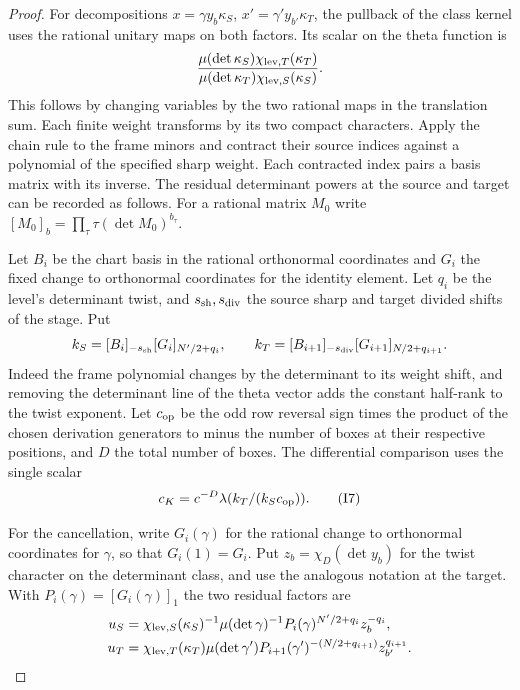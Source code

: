 \begin{proof}

For decompositions
\(x=\gamma y_b\kappa_S\), \(x'=\gamma' y_{b'}\kappa_T\),
the pullback of the class kernel uses the rational unitary
maps on both factors. Its scalar on the theta function is
\[
     \frac{\mu(\det\kappa_S)\chi_{{\rm lev},T}(\kappa_T)}
          {\mu(\det\kappa_T)\chi_{{\rm lev},S}(\kappa_S)} .
\]
This follows by changing variables by the two rational maps in
the translation sum. Each finite weight transforms by its two
compact characters. Apply the chain rule to the frame minors
and contract their source indices against a polynomial of the
specified sharp weight. Each contracted index pairs a basis
matrix with its inverse. The residual determinant powers at
the source and target can be recorded as follows. For a rational
matrix \(M_0\) write \([M_0]_b=\prod_\tau\tau(\det M_0)^{b_\tau}\).

Let \(B_i\) be the chart basis in the rational orthonormal
coordinates and \(G_i\) the fixed change to orthonormal
coordinates for the identity element. Let \(q_i\) be the
level's determinant twist, and \(s_{\rm sh},s_{\rm div}\)
the source sharp and target divided shifts of the stage. Put
\[
 k_S=[B_i]_{-s_{\rm sh}}[G_i]_{N'/2+q_i},\qquad
 k_T=[B_{i+1}]_{-s_{\rm div}}[G_{i+1}]_{N/2+q_{i+1}} .
\]
Indeed the frame polynomial changes by the determinant to its
weight shift, and removing the determinant line of the theta
vector adds the constant half-rank to the twist exponent.
Let \(c_{\rm op}\) be the odd row reversal sign times the product
of the chosen derivation generators to minus the number of boxes
at their respective positions, and \(D\) the total number of boxes.
The differential comparison uses the single scalar
\[
                 c_K=c^{-D}\lambda(k_T/(k_S c_{\rm op})).
 \tag{I7}\label{eq:tag-i7}
\]

For the cancellation, write \(G_i(\gamma)\) for the rational
change to orthonormal coordinates for \(\gamma\), so that
\(G_i(1)=G_i\). Put \(z_b=\chi_D(\det y_b)\) for the twist
character on the determinant class, and use the analogous
notation at the target. With \(P_i(\gamma)=[G_i(\gamma)]_1\)
the two residual factors are
\[
\begin{aligned}
 u_S&=\chi_{{\rm lev},S}(\kappa_S)^{-1}\mu(\det\gamma)^{-1}
            P_i(\gamma)^{N'/2+q_i} z_b^{-q_i},\\
 u_T&=\chi_{{\rm lev},T}(\kappa_T)\mu(\det\gamma')
            P_{i+1}(\gamma')^{-(N/2+q_{i+1})} z_{b'}^{q_{i+1}} .
\end{aligned}
\]


\end{proof}
